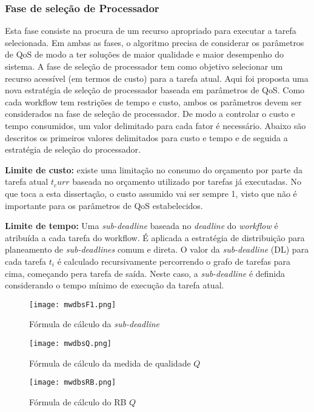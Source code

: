 \subsubsection{Fase de seleção de Processador}
Esta fase consiste na procura de um recurso apropriado para executar a tarefa selecionada.
Em ambas as fases, o algoritmo precisa de considerar os parâmetros de QoS de modo a ter soluções de maior qualidade e maior desempenho do sistema.
A fase de seleção de processador tem como objetivo selecionar um recurso acessível (em termos de custo) para a tarefa atual. Aqui foi proposta uma nova estratégia de seleção de processador baseada em parâmetros de QoS. Como cada workflow tem restrições de tempo e custo, ambos os parâmetros devem ser considerados na fase de seleção de processador. De modo a controlar o custo e tempo consumidos, um valor delimitado para cada fator é necessário.
Abaixo são descritos os primeiros valores delimitados para custo e tempo e de seguida a estratégia de seleção do processador.

\textbf{Limite de custo:} existe uma limitação no consumo do orçamento por parte da tarefa atual $t_curr$ baseada no orçamento utilizado por tarefas já executadas. No que toca a esta dissertação, o custo assumido vai ser sempre 1, visto que não é importante para os parâmetros de QoS estabelecidos.

\textbf{Limite de tempo:} Uma \textit{sub-deadline} baseada no \textit{deadline} do \textit{workflow} é atribuída a cada tarefa do workflow. É aplicada a estratégia de distribuição para planeamento de \textit{sub-deadlines} comum e direta.
O valor da \textit{sub-deadline} (DL) para cada tarefa $t_i$ é calculado recursivamente percorrendo o grafo de tarefas para cima, começando pera tarefa de saída. Neste caso, a \textit{sub-deadline} é definida considerando o tempo mínimo de execução da tarefa atual.

\begin{figure}[H]
	\centering
	\texttt{[image: mwdbsF1.png]}
	\caption{Fórmula de cálculo da \textit{sub-deadline}}
	\label{mwdbsF1}
\end{figure}

\begin{figure}[H]
	\centering
	\texttt{[image: mwdbsQ.png]}
	\caption{Fórmula de cálculo da medida de qualidade $Q$}
	\label{mwdbsQ}
\end{figure}

\begin{figure}[H]
	\centering
	\texttt{[image: mwdbsRB.png]}
	\caption{Fórmula de cálculo do RB $Q$}
	\label{mwdbsRB}
\end{figure}


